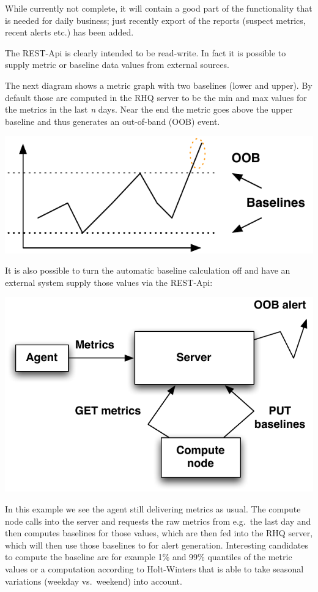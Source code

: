 \documentclass[twocolumn,10pt,a4paper]{article}
\begin{document}
While currently not complete, it will contain a good part of the functionality
that is needed for daily business; just recently export of the reports (suspect metrics, recent alerts etc.) has been added. 

The REST-Api is clearly intended to be read-write. In fact it is possible to supply metric or baseline data values from external sources. 

The next diagram shows a metric graph with two baselines (lower and upper). By default those are computed in the RHQ server to be the min and max values for the metrics in the last \emph{n} days. Near the end the metric goes above the upper baseline and thus generates an out-of-band (OOB) event.

\noindent\includegraphics[width=\columnwidth]{graph/baseline_graph.pdf}

It is also possible to turn the automatic baseline calculation off and have an external system supply those values via the REST-Api:

\noindent\includegraphics[width=\columnwidth]{graph/ext_baseline.pdf}

In this example we see the agent still delivering metrics as usual. The compute node calls into the server and requests the raw metrics from e.g.\ the last day and then computes baselines for those values, which are then fed into the RHQ server, which will then use those baselines to for alert generation. Interesting candidates to compute the baseline are for example 1\% and 99\% quantiles of the metric values or a computation according to Holt-Winters that is able to take seasonal variations (weekday vs.\ weekend) into account.
\end{document}

